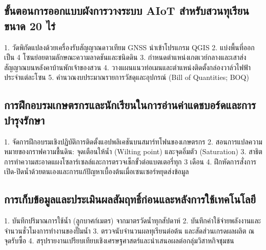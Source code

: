 \subsection{ขั้นตอนการออกแบบผังการวางระบบ AIoT สำหรับสวนทุเรียนขนาด 20 ไร่}
\begin{sensorbox}
1. วัดพิกัดแปลงด้วยเครื่องรับสัญญาณดาวเทียม GNSS นำเข้าโปรแกรม QGIS
2. แบ่งพื้นที่ออกเป็น 4 โซนย่อยตามลักษณะความลาดชันและชนิดดิน
3. กำหนดตำแหน่งเกตเวย์กลางและเสาส่งสัญญาณบนหลังคาบ้านพักเจ้าของสวน
4. วางแผนแนวท่อเมนและตำแหน่งติดตั้งกล่องวาล์วไฟฟ้าประจำแต่ละโซน
5. คำนวณงบประมาณรายการวัสดุและอุปกรณ์ (Bill of Quantities; BOQ)
\end{sensorbox}

\subsection{การฝึกอบรมเกษตรกรและนักเรียนในการอ่านค่าแดชบอร์ดและการบำรุงรักษา}
\begin{sensorbox}
1. จัดการฝึกอบรมเชิงปฏิบัติการติดตั้งแอปพลิเคชันบนสมาร์ทโฟนของเกษตรกร
2. สอนการแปลความหมายของกราฟความชื้นดิน: จุดเตือนให้น้ำ (Wilting point) และจุดอิ่มตัว (Saturation)
3. สาธิตการทำความสะอาดแผงโซลาร์เซลล์และการตรวจเช็กขั้วต่อแบตเตอรี่ทุก 3 เดือน
4. ฝึกหัดการสั่งการเปิด-ปิดน้ำด้วยตนเองและการแก้ปัญหาเบื้องต้นเมื่อเซนเซอร์หยุดส่งข้อมูล
\end{sensorbox}

\subsection{การเก็บข้อมูลและประเมินผลสัมฤทธิ์ก่อนและหลังการใช้เทคโนโลยี}
\begin{sensorbox}
1. บันทึกปริมาณการใช้น้ำ (ลูกบาศก์เมตร) จากมาตรวัดน้ำทุกสัปดาห์
2. บันทึกค่าใช้จ่ายพลังงานและจำนวนชั่วโมงการทำงานของปั๊มน้ำ
3. ตรวจนับจำนวนผลทุเรียนต่อต้น และสัดส่วนเกรดผลผลิต ณ จุดรับซื้อ
4. สรุปรายงานเปรียบเทียบเชิงเศรษฐศาสตร์และนำเสนอผลต่อกลุ่มวิสาหกิจชุมชน
\end{sensorbox}

